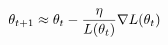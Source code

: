 \documentclass[preview]{standalone}
\begin{document}
\begin{align*}
\special{dvisvgm:raw <g id='unique000'>}\theta_{t+1} \approx \theta_t - \frac{\eta}{L(\theta_t)}\nabla L(\theta_t)\special{dvisvgm:raw </g>}
\end{align*}
\end{document}
